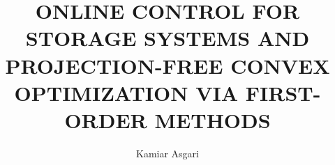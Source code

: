 \title{ONLINE CONTROL FOR STORAGE SYSTEMS AND PROJECTION-FREE CONVEX OPTIMIZATION VIA FIRST-ORDER METHODS}
\author{Kamiar Asgari}

